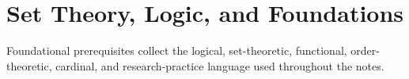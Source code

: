 \part{Set Theory, Logic, and Foundations}

Foundational prerequisites collect the logical, set-theoretic, functional, order-theoretic, cardinal, and research-practice language used throughout the notes.









